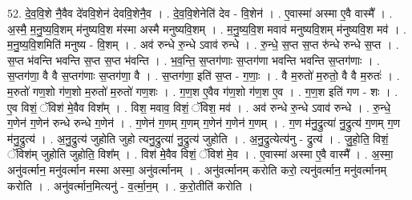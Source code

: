 \documentclass[17pt]{extarticle}
\begin{document}
52. दे॒व॒वि॒शे नै॒वैव दे॑ववि॒शेन॑ देववि॒शेनै॒व । . दे॒व॒वि॒शेनेति॑ देव - वि॒शेन॑ । . ए॒वास्मा॑ अस्मा ए॒वै वास्मै᳚ । . अ॒स्मै॒ म॒नु॒ष्य॒वि॒शम् म॑नुष्यवि॒श म॑स्मा अस्मै मनुष्यवि॒शम् । . म॒नु॒ष्य॒वि॒श मवाव॑ मनुष्यवि॒शम् म॑नुष्यवि॒श मव॑ । . म॒नु॒ष्य॒वि॒शमिति॑ मनुष्य - वि॒शम् । . अव॑ रुन्धे रु॒न्धे ऽवाव॑ रुन्धे । . रु॒न्धे॒ स॒प्त स॒प्त रु॑न्धे रुन्धे स॒प्त । . स॒प्त भ॑वन्ति भवन्ति स॒प्त स॒प्त भ॑वन्ति । . भ॒व॒न्ति॒ स॒प्तग॑णाः स॒प्तग॑णा भवन्ति भवन्ति स॒प्तग॑णाः । . स॒प्तग॑णा॒ वै वै स॒प्तग॑णाः स॒प्तग॑णा॒ वै । . स॒प्तग॑णा॒ इति॑ स॒प्त - ग॒णाः॒ । . वै म॒रुतो॑ म॒रुतो॒ वै वै म॒रुतः॑ । . म॒रुतो॑ गण॒शो ग॑ण॒शो म॒रुतो॑ म॒रुतो॑ गण॒शः । . ग॒ण॒श ए॒वैव ग॑ण॒शो ग॑ण॒श ए॒व । . ग॒ण॒श इति॑ गण - शः । . ए॒व विशं॒ ॅविश॑ मे॒वैव विश᳚म् । . विश॒ मवाव॒ विशं॒ ॅविश॒ मव॑ । . अव॑ रुन्धे रु॒न्धे ऽवाव॑ रुन्धे । . रु॒न्धे॒ ग॒णेन॑ ग॒णेन॑ रुन्धे रुन्धे ग॒णेन॑ । . ग॒णेन॑ ग॒णम् ग॒णम् ग॒णेन॑ ग॒णेन॑ ग॒णम् । . ग॒ण म॑नु॒द्रुत्या॑ नु॒द्रुत्य॑ ग॒णम् ग॒ण म॑नु॒द्रुत्य॑ । . अ॒नु॒द्रुत्य॑ जुहोति जुहो त्यनु॒द्रुत्या॑ नु॒द्रुत्य॑ जुहोति । . अ॒नु॒द्रुत्येत्य॑नु - द्रुत्य॑ । . जु॒हो॒ति॒ विशं॒ ॅविश॑म् जुहोति जुहोति॒ विश᳚म् । . विश॑ मे॒वैव विशं॒ ॅविश॑ मे॒व । . ए॒वास्मा॑ अस्मा ए॒वै वास्मै᳚ । . अ॒स्मा॒ अनु॑वर्त्मान॒ मनु॑वर्त्मान मस्मा अस्मा॒ अनु॑वर्त्मानम् । . अनु॑वर्त्मानम् करोति करो॒ त्यनु॑वर्त्मान॒ मनु॑वर्त्मानम् करोति । . अनु॑वर्त्मान॒मित्यनु॑ - व॒र्त्मा॒न॒म् । . क॒रो॒तीति॑ करोति । \newline
\end{document}
